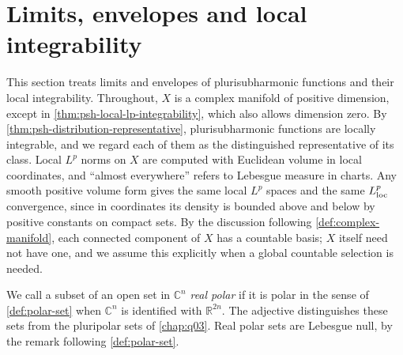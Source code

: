 \section{Limits, envelopes and local integrability}
\label{sec:psh-limits-envelopes}

This section treats limits and envelopes of plurisubharmonic functions and their local integrability. Throughout, $X$ is a complex manifold of positive dimension, except in \cref{thm:psh-local-lp-integrability}, which also allows dimension zero. By \cref{thm:psh-distribution-representative}, plurisubharmonic functions are locally integrable, and we regard each of them as the distinguished representative of its class. Local $L^p$ norms on $X$ are computed with Euclidean volume in local coordinates, and ``almost everywhere'' refers to Lebesgue measure in charts. Any smooth positive volume form gives the same local $L^p$ spaces and the same $L^p_{\mathrm{loc}}$ convergence, since in coordinates its density is bounded above and below by positive constants on compact sets. By the discussion following \cref{def:complex-manifold}, each connected component of $X$ has a countable basis; $X$ itself need not have one, and we assume this explicitly when a global countable selection is needed.

We call a subset of an open set in $\mathbb{C}^n$ \emph{real polar} if it is polar in the sense of \cref{def:polar-set} when $\mathbb{C}^n$ is identified with $\mathbb R^{2n}$. The adjective distinguishes these sets from the pluripolar sets of \cref{chap:q03}. Real polar sets are Lebesgue null, by the remark following \cref{def:polar-set}.

